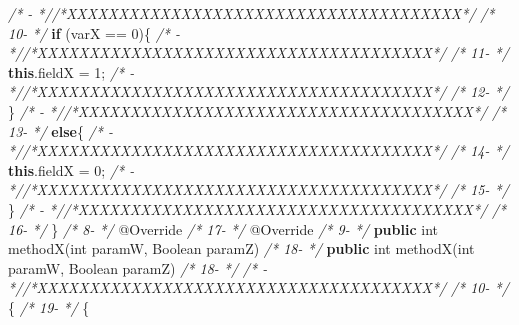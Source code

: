 \documentclass[
]{article}
\newenvironment{Shaded}{\begin{snugshade}}{\end{snugshade}}
\newcommand{\AttributeTok}[1]{\textcolor[rgb]{0.77,0.63,0.00}{#1}}
\newcommand{\BuiltInTok}[1]{#1}
\newcommand{\CommentTok}[1]{\textcolor[rgb]{0.56,0.35,0.01}{\textit{#1}}}
\newcommand{\DataTypeTok}[1]{\textcolor[rgb]{0.13,0.29,0.53}{#1}}
\newcommand{\DecValTok}[1]{\textcolor[rgb]{0.00,0.00,0.81}{#1}}
\newcommand{\FunctionTok}[1]{\textcolor[rgb]{0.00,0.00,0.00}{#1}}
\newcommand{\KeywordTok}[1]{\textcolor[rgb]{0.13,0.29,0.53}{\textbf{#1}}}
\newcommand{\NormalTok}[1]{#1}
\begin{document}
\begin{landscape}
\begin{Shaded}
\begin{Highlighting}[]
\CommentTok{/*   -                 *//*XXXXXXXXXXXXXXXXXXXXXXXXXXXXXXXXXXXXXX*/}                     \CommentTok{/* 10-                 */}        \KeywordTok{if}\NormalTok{ (varX == }\DecValTok{0}\NormalTok{)\{                                        }
\CommentTok{/*   -                 *//*XXXXXXXXXXXXXXXXXXXXXXXXXXXXXXXXXXXXXX*/}                     \CommentTok{/* 11-                 */}            \KeywordTok{this}\NormalTok{.}\FunctionTok{fieldX}\NormalTok{ = }\DecValTok{1}\NormalTok{;                                   }
\CommentTok{/*   -                 *//*XXXXXXXXXXXXXXXXXXXXXXXXXXXXXXXXXXXXXX*/}                     \CommentTok{/* 12-                 */}\NormalTok{        \}                                                      }
\CommentTok{/*   -                 *//*XXXXXXXXXXXXXXXXXXXXXXXXXXXXXXXXXXXXXX*/}                     \CommentTok{/* 13-                 */}        \KeywordTok{else}\NormalTok{\{                                                  }
\CommentTok{/*   -                 *//*XXXXXXXXXXXXXXXXXXXXXXXXXXXXXXXXXXXXXX*/}                     \CommentTok{/* 14-                 */}            \KeywordTok{this}\NormalTok{.}\FunctionTok{fieldX}\NormalTok{ = }\DecValTok{0}\NormalTok{;                                   }
\CommentTok{/*   -                 *//*XXXXXXXXXXXXXXXXXXXXXXXXXXXXXXXXXXXXXX*/}                     \CommentTok{/* 15-                 */}\NormalTok{        \}                                                      }
\CommentTok{/*   -                 *//*XXXXXXXXXXXXXXXXXXXXXXXXXXXXXXXXXXXXXX*/}                     \CommentTok{/* 16-                 */}\NormalTok{    \}                                                          }
\CommentTok{/*  8-                 */}    \AttributeTok{@Override}                                                  \CommentTok{/* 17-                 */}    \AttributeTok{@Override}                                                  
\CommentTok{/*  9-                 */}    \KeywordTok{public} \DataTypeTok{int} \FunctionTok{methodX}\NormalTok{(}\DataTypeTok{int}\NormalTok{ paramW, }\BuiltInTok{Boolean}\NormalTok{ paramZ)             }\CommentTok{/* 18-                 */}    \KeywordTok{public} \DataTypeTok{int} \FunctionTok{methodX}\NormalTok{(}\DataTypeTok{int}\NormalTok{ paramW, }\BuiltInTok{Boolean}\NormalTok{ paramZ)             }
\CommentTok{/* 18-                 */}                                                               \CommentTok{/*   -                 *//*XXXXXXXXXXXXXXXXXXXXXXXXXXXXXXXXXXXXXX*/}                     
\CommentTok{/* 10-                 */}\NormalTok{    \{                                                          }\CommentTok{/* 19-                 */}\NormalTok{    \{                                                          }

\end{Highlighting}
\end{Shaded}
\end{landscape}
\end{document}
